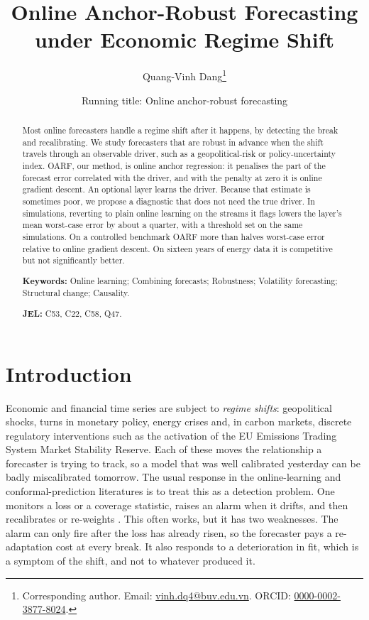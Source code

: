 \documentclass[11pt]{article}
\title{\bfseries Online Anchor-Robust Forecasting under Economic Regime Shift}
\author[1]{Quang-Vinh Dang\thanks{Corresponding author. Email:
\href{mailto:vinh.dq4@buv.edu.vn}{vinh.dq4@buv.edu.vn}. ORCID:
\href{https://orcid.org/0000-0002-3877-8024}{0000-0002-3877-8024}.}}
\affil[1]{\small British University Vietnam, Hung Yen, Vietnam}
\date{\small Running title: Online anchor-robust forecasting}
\theoremstyle{plain}
\theoremstyle{remark}
\begin{document}
\maketitle

\begin{abstract}
\noindent
Most online forecasters handle a regime shift after it happens, by detecting the
break and recalibrating. We study forecasters that are robust in advance when
the shift travels through an observable driver, such as a geopolitical-risk or
policy-uncertainty index. OARF, our method, is online anchor regression: it
penalises the part of the forecast error correlated with the driver, and with
the penalty at zero it is online gradient descent. An optional layer learns the
driver. Because that estimate is sometimes poor, we propose a diagnostic that
does not need the true driver. In simulations, reverting to plain online
learning on the streams it flags lowers the layer's mean worst-case error by
about a quarter, with a threshold set on the same simulations. On a controlled
benchmark OARF more than halves worst-case error relative to online gradient
descent. On sixteen years of energy data it is competitive but not significantly
better.

\vspace{0.6em}
\noindent\textbf{Keywords:} Online learning; Combining forecasts; Robustness; Volatility forecasting; Structural change; Causality.

\vspace{0.3em}
\noindent\textbf{JEL:} C53, C22, C58, Q47.
\end{abstract}

\section{Introduction}\label{sec:intro}

Economic and financial time series are subject to \emph{regime shifts}:
geopolitical shocks, turns in monetary policy, energy crises and, in carbon
markets, discrete regulatory interventions such as the activation of the EU
Emissions Trading System Market Stability Reserve. Each of these moves the
relationship a forecaster is trying to track, so a model that was well calibrated
yesterday can be badly miscalibrated tomorrow. The usual response in the
online-learning and conformal-prediction literatures is to treat this as a
detection problem. One monitors a loss or a coverage statistic, raises an alarm
when it drifts, and then recalibrates or re-weights
\citep{gibbs2021aci,mfisher2025,watch2025}. This often works, but it has two
weaknesses. The alarm can only fire after the loss has
already risen, so the forecaster pays a re-adaptation cost at every break. It also
responds to a deterioration in fit, which is a symptom of the shift, and not to
whatever produced it.
\end{document}
